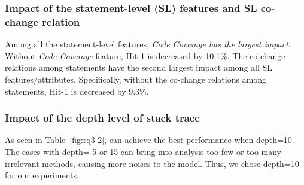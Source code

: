 
\subsubsection{\bf Impact of the statement-level (SL) features and SL co-change relation}

Among all the statement-level features, {\it Code Coverage
has the largest impact}. Without {\it Code Coverage} feature,
Hit-1 is decreased by 10.1\%.
%
The co-change relations among statements have the second largest
impact among all SL features/attributes. Specifically, without
the co-change relations among statements, Hit-1 is decreased by 9.3\%.






\subsubsection{\bf Impact of the depth level of stack trace}

As seen in Table~\ref{fig:rq3-2},
{\tool} can achieve the best performance when depth=10. The cases with
depth= 5 or 15 can bring into analysis too few or too many irrelevant
methods, causing more noises to the model.
Thus, we chose depth=10 for our experiments.







